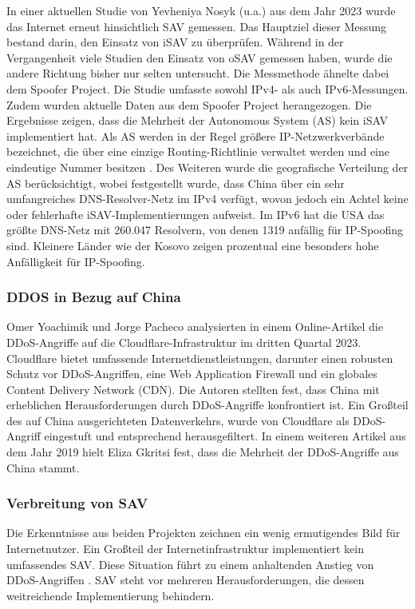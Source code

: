 \documentclass[sigplan,screen]{acmart}
\begin{document}
In einer aktuellen Studie von Yevheniya Nosyk (u.a.) aus dem Jahr 2023 \cite{CRP01} wurde das Internet erneut hinsichtlich SAV gemessen. Das Hauptziel dieser Messung bestand darin, den Einsatz von iSAV zu überprüfen. Während in der Vergangenheit viele Studien den Einsatz von oSAV gemessen haben, wurde die andere Richtung bisher nur selten untersucht. Die Messmethode ähnelte dabei dem Spoofer Project. Die Studie umfasste sowohl IPv4- als auch IPv6-Messungen. Zudem wurden aktuelle Daten aus dem Spoofer Project herangezogen. Die Ergebnisse zeigen, dass die Mehrheit der Autonomous System (AS) kein iSAV implementiert hat. Als AS werden in der Regel größere IP-Netzwerkverbände bezeichnet, die über eine einzige Routing-Richtlinie verwaltet werden und eine eindeutige Nummer besitzen \cite{as01}. Des Weiteren wurde die geografische Verteilung der AS berücksichtigt, wobei festgestellt wurde, dass China über ein sehr umfangreiches DNS-Resolver-Netz im IPv4 verfügt, wovon jedoch ein Achtel keine oder fehlerhafte iSAV-Implementierungen aufweist. Im IPv6 hat die USA das größte DNS-Netz mit 260.047 Resolvern, von denen 1319 anfällig für IP-Spoofing sind. Kleinere Länder wie der Kosovo zeigen prozentual eine besonders hohe Anfälligkeit für IP-Spoofing.

\subsubsection{DDOS in Bezug auf China}

Omer Yoachimik und Jorge Pacheco \cite{cloudflaeDDoS01} analysierten in einem Online-Artikel die DDoS-Angriffe auf die Cloudflare-Infrastruktur im dritten Quartal 2023. Cloudflare bietet umfassende Internetdienstleistungen, darunter einen robusten Schutz vor DDoS-Angriffen, eine Web Application Firewall und ein globales Content Delivery Network (CDN). Die Autoren stellten fest, dass China mit erheblichen Herausforderungen durch DDoS-Angriffe konfrontiert ist. Ein Großteil des auf China ausgerichteten Datenverkehrs, wurde von Cloudflare als DDoS-Angriff eingestuft und entsprechend herausgefiltert. In einem weiteren Artikel aus dem Jahr 2019 hielt Eliza Gkritsi \cite{technode01} fest, dass die Mehrheit der DDoS-Angriffe aus China stammt.

\subsubsection{Verbreitung von SAV}

Die Erkenntnisse aus beiden Projekten zeichnen ein wenig ermutigendes Bild für Internetnutzer. Ein Großteil der Internetinfrastruktur implementiert kein umfassendes SAV. Diese Situation führt zu einem anhaltenden Anstieg von DDoS-Angriffen \cite{CRP01}. SAV steht vor mehreren Herausforderungen, die dessen weitreichende Implementierung behindern. 
\end{document}
